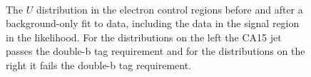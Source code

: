 \begin{figure}
  \\
\caption{The $U$ distribution in the electron control regions before and after a background-only fit to data, including the data in the signal region in the likelihood. For the distributions on the left the CA15 jet passes the double-b tag requirement and for the distributions on the right it fails the double-b tag requirement.}
\label{Fig_cr_2}
\end{figure}


